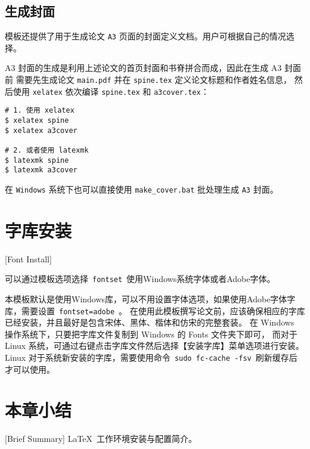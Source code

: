 \subsection{生成封面}
\label{sec:generate-cover}
模板还提供了用于生成论文 \texttt{A3} 页面的封面定义文档。用户可根据自己的情况选择。

A3 封面的生成是利用上述论文的首页封面和书脊拼合而成，因此在生成 A3 封面前
需要先生成论文 \texttt{main.pdf} 并在 \texttt{spine.tex} 定义论文标题和作者姓名信息，
然后使用 \texttt{xelatex} 依次编译 \texttt{spine.tex} 和 \texttt{a3cover.tex}：

\begin{lstlisting}
# 1. 使用 xelatex 
$ xelatex spine
$ xelatex a3cover

# 2. 或者使用 latexmk
$ latexmk spine
$ latexmk a3cover
\end{lstlisting}

在 \texttt{Windows} 系统下也可以直接使用 \texttt{make\_cover.bat} 批处理生成 \texttt{A3} 封面。

\section{字库安装}[Font Install]

可以通过模板选项选择~\texttt{fontset}~使用Windows系统字体或者Adobe字体。

本模板默认是使用Windows库，可以不用设置字体选项，如果使用Adobe字体字库，需要设置~\texttt{fontset=adobe}~。
在使用此模板撰写论文前，应该确保相应的字库已经安装，并且最好是包含宋体、黑体、楷体和仿宋的完整套装。
在 Windows 操作系统下，只要把字库文件复制到 Windows 的 Fonts 文件夹下即可，
而对于 Linux 系统，可通过右键点击字库文件然后选择【安装字库】菜单选项进行安装。
Linux 对于系统新安装的字库，需要使用命令~\texttt{sudo fc-cache -fsv}~刷新缓存后才可以使用。

\section*{本章小结}[Brief Summary]
\LaTeX{}~工作环境安装与配置简介。
